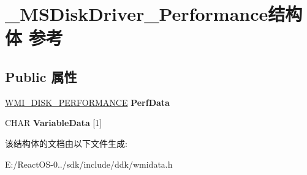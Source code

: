 \hypertarget{struct___m_s_disk_driver___performance}{}\section{\+\_\+\+M\+S\+Disk\+Driver\+\_\+\+Performance结构体 参考}
\label{struct___m_s_disk_driver___performance}
\subsection*{Public 属性}
\begin{DoxyCompactItemize}
\item 
\mbox{\label{struct___m_s_disk_driver___performance_a9da8ffdc54d81f5cf3bcd68070ad4547}} 
\hyperlink{struct___w_m_i___d_i_s_k___p_e_r_f_o_r_m_a_n_c_e}{W\+M\+I\+\_\+\+D\+I\+S\+K\+\_\+\+P\+E\+R\+F\+O\+R\+M\+A\+N\+CE} {\bfseries Perf\+Data}
\item 
\mbox{\label{struct___m_s_disk_driver___performance_a7695a927945e058c6a8d975a62d56007}} 
C\+H\+AR {\bfseries Variable\+Data} \mbox{[}1\mbox{]}
\end{DoxyCompactItemize}


该结构体的文档由以下文件生成\+:\begin{DoxyCompactItemize}
\item 
E\+:/\+React\+O\+S-\/0../sdk/include/ddk/wmidata.\+h\end{DoxyCompactItemize}
